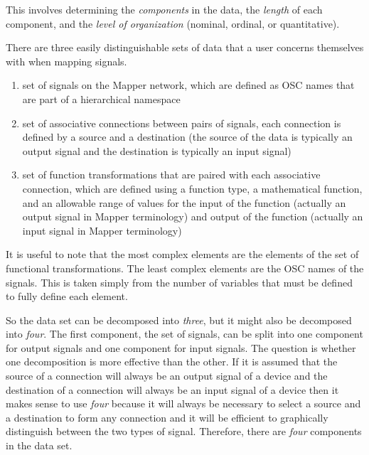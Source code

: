 This involves determining the \emph{components} in the data, the \emph{length} of each component, and the \emph{level of organization} (nominal, ordinal, or quantitative).

There are three easily distinguishable sets of data that a user concerns themselves with when mapping signals.

\begin{enumerate}
\item set of signals on the Mapper network, which are defined as OSC names that are part of a hierarchical namespace
\item set of associative connections between pairs of signals, each connection is defined by a source and a destination (the source of the data is typically an output signal and the destination is typically an input signal)
\item set of function transformations that are paired with each associative connection, which are defined using a function type, a mathematical function, and an allowable range of values for the input of the function (actually an output signal in Mapper terminology) and output of the function (actually an input signal in Mapper terminology)
\end{enumerate}

It is useful to note that the most complex elements are the elements of the set of functional transformations. The least complex elements are the OSC names of the signals. This is taken simply from the number of variables that must be defined to fully define each element.

So the data set can be decomposed into \emph{three}, but it might also be decomposed into \emph{four}. The first component, the set of signals, can be split into one component for output signals and one component for input signals. The question is whether one decomposition is more effective than the other. If it is assumed that the source of a connection will always be an output signal of a device and the destination of a connection will always be an input signal of a device then it makes sense to use \emph{four} because it will always be necessary to select a source and a destination to form any connection and it will be efficient to graphically distinguish between the two types of signal. Therefore, there are \emph{four} components in the data set.

